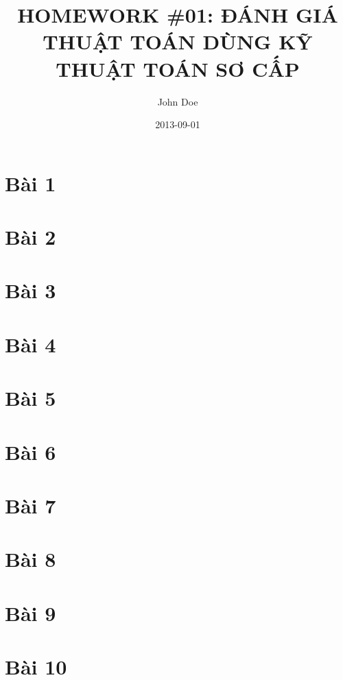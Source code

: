 \documentclass{article}
\title{HOMEWORK \#01: ĐÁNH GIÁ THUẬT TOÁN DÙNG KỸ THUẬT TOÁN SƠ CẤP}
\date{2013-09-01}
\author{John Doe}
\begin{document}
    
    \pagebreak
    
    \section{Bài 1}
    \section{Bài 2}
        
    \section{Bài 3}
    \section{Bài 4}
    \section{Bài 5}
    \section{Bài 6}
    \section{Bài 7}
    \section{Bài 8}
        
    \section{Bài 9}
    \section{Bài 10}
    
\end{document}
